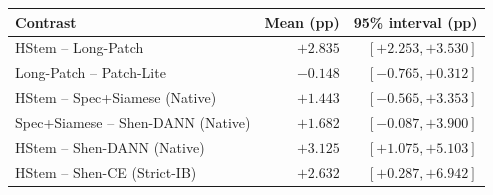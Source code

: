 \begin{tabular}{lrr}
\toprule Contrast & Mean (pp) & 95\% interval (pp)\\
\midrule
HStem -- Long-Patch & $+2.835$ & $[+2.253, +3.530]$\\
Long-Patch -- Patch-Lite & $-0.148$ & $[-0.765, +0.312]$\\
HStem -- Spec+Siamese (Native) & $+1.443$ & $[-0.565, +3.353]$\\
Spec+Siamese -- Shen-DANN (Native) & $+1.682$ & $[-0.087, +3.900]$\\
HStem -- Shen-DANN (Native) & $+3.125$ & $[+1.075, +5.103]$\\
HStem -- Shen-CE (Strict-IB) & $+2.632$ & $[+0.287, +6.942]$\\
\bottomrule
\end{tabular}

